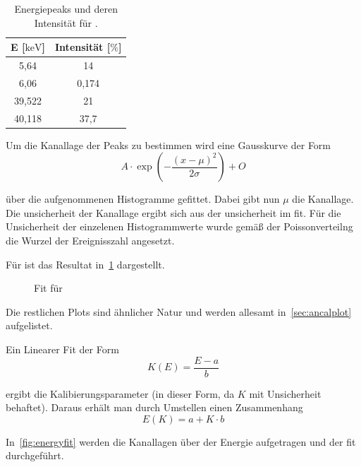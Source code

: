 \documentclass[draft, slug=CS, room=Andreas-Schubert-Bau\,\ Labor\ 406,
supervisor=Juliane\ Volkmer, coursedate=29.\ 11.\ 2019]{../../Lab_Report_LaTeX/lab_report}
\begin{document}
\begin{table}[H]
  \centering
  \begin{tabular}{S|S}
    \toprule
    {E [\(\si{\kilo\electronvolt}\)]} & {Intensität [\(\si{\percent}\)]} \\
    \midrule
     5,64                              & 14                               \\
    6,06                              & 0,174                            \\
    39,522                            & 21                               \\
    40,118                            & 37,7
  \end{tabular}
  \caption{Energiepeaks und deren Intensität für .}
  \label{tab:eupeaks}
\end{table}

Um die Kanallage der Peaks zu bestimmen wird eine Gausskurve der Form
\begin{equation}
  \label{eq:gaussfit}
  A\cdot\exp(-\frac{(x-\mu)^2}{2\sigma}) + O
\end{equation}

\"uber die aufgenommenen Histogramme gefittet. Dabei gibt nun \(\mu\)
die Kanallage. Die unsicherheit der Kanallage ergibt sich aus der
unsicherheit im fit. Für die Unsicherheit der einzelenen
Histogrammwerte wurde gem\"a\ss{} der Poissonverteilng die Wurzel der
Ereignisszahl angesetzt.

Für  ist das Resultat in~\ref{fig:calfitcs} dargestellt.
\begin{figure}[h]\centering
  
  \caption{Fit f\"ur }
  \label{fig:calfitcs}
\end{figure}

Die restlichen Plots sind \"ahnlicher Natur und werden allesamt
in~\ref{sec:ancalplot} aufgelistet.

Ein Linearer Fit der Form
\begin{equation}
  \label{eq:linclafit}
  K(E) = \frac{E-a}{b}
\end{equation}

ergibt die Kalibierungsparameter (in dieser Form, da \(K\) mit
Unsicherheit behaftet). Daraus erhält man durch Umstellen
einen Zusammenhang
\begin{equation}
  \label{eq:linclafit}
  E(K) = a + K\cdot b
\end{equation}

In~\ref{fig:energyfit} werden die Kanallagen \"uber der Energie
aufgetragen und der fit durchgef\"uhrt.
\end{document}
